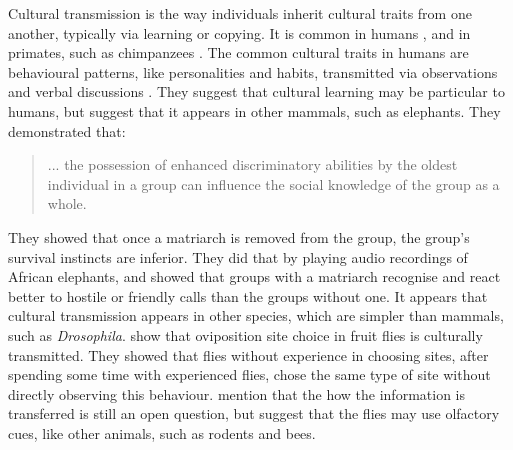 \documentclass[11pt]{article}
\begin{document}
Cultural transmission is the way individuals inherit cultural traits from one another, typically via learning or copying. %
 It is common in humans \citep[pg. 3]{transmissionVectorsBook}, and in primates, such as chimpanzees \citep{chimpsPrestige, chimpsCopy}. %
 The common cultural traits in humans are behavioural patterns, like personalities and habits, transmitted via observations and verbal discussions \citep{dualEvolution}. %
 They suggest that cultural learning may be particular to humans, but \citet{elepahntsRepo} suggest that it appears in other mammals, such as elephants. %
 They demonstrated that: 
 \begin{quote}
	   ... the possession of enhanced discriminatory abilities by the oldest individual in a group can influence the social knowledge of the group as a whole.
 \end{quote}
 They showed that once a matriarch is removed from the group, the group's survival instincts are inferior. %
 They did that by playing audio recordings of African elephants, and showed that groups with a matriarch recognise and react better to hostile or friendly calls than the groups without one. %
It appears that cultural transmission appears in other species, which are simpler than mammals, such as \textit{Drosophila}. %
\citet{fliesPaper} show that oviposition site choice in fruit flies is culturally transmitted. %
They showed that flies without experience in choosing sites, after spending some time with experienced flies, chose the same type of site without directly observing this behaviour. %
\citet{fliesPaper} mention that the how the information is transferred is still an open question, but suggest that the flies may use olfactory cues, like other animals, such as rodents and bees.\\ %
\end{document}
